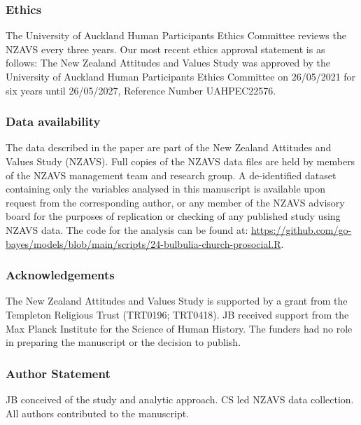 \documentclass[
  single column]{article}
\begin{document}
\newpage{}

\subsubsection{Ethics}\label{ethics}

The University of Auckland Human Participants Ethics Committee reviews
the NZAVS every three years. Our most recent ethics approval statement
is as follows: The New Zealand Attitudes and Values Study was approved
by the University of Auckland Human Participants Ethics Committee on
26/05/2021 for six years until 26/05/2027, Reference Number UAHPEC22576.

\subsubsection{Data availability}\label{data-availability}

The data described in the paper are part of the New Zealand Attitudes
and Values Study (NZAVS). Full copies of the NZAVS data files are held
by members of the NZAVS management team and research group. A
de-identified dataset containing only the variables analysed in this
manuscript is available upon request from the corresponding author, or
any member of the NZAVS advisory board for the purposes of replication
or checking of any published study using NZAVS data. The code for the
analysis can be found at:
\url{https://github.com/go-bayes/models/blob/main/scripts/24-bulbulia-church-prosocial.R}.

\subsubsection{Acknowledgements}\label{acknowledgements}

The New Zealand Attitudes and Values Study is supported by a grant from
the Templeton Religious Trust (TRT0196; TRT0418). JB received support
from the Max Planck Institute for the Science of Human History. The
funders had no role in preparing the manuscript or the decision to
publish.

\subsubsection{Author Statement}\label{author-statement}

JB conceived of the study and analytic approach. CS led NZAVS data
collection. All authors contributed to the manuscript.

\newpage{}
\end{document}
